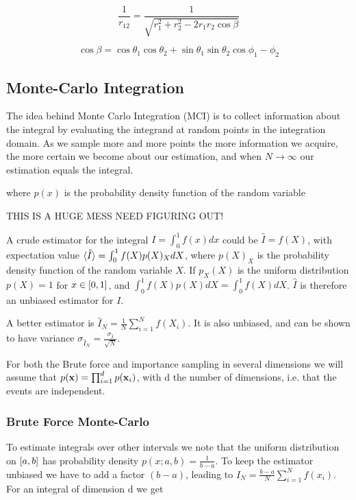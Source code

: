 \begin{equation}
  \label{eq:distance_spherical}
  \frac{1}{r_{12}} = \frac{1}{\sqrt{r_1^2 + r_2^2 - 2r_1r_2 \cos{\beta}}}
\end{equation}

\begin{equation}
  \label{eq:cos_beta}
  \cos{\beta} = \cos{\theta_1} \cos{\theta_2} + \sin{\theta_1} \sin{\theta_2}
  \cos{\phi_1 -\phi_2}
\end{equation}

\subsection{Monte-Carlo Integration}

The idea behind Monte Carlo Integration (MCI) is to collect information
about the integral by evaluating the integrand
at random points in the integration domain. As we sample more and more points
the more information we acquire, the more certain we become about our
estimation, and when $N \to \infty$ our estimation equals the integral.  

where $p(x)$ is the probability density function of the random variable

THIS IS A HUGE MESS NEED FIGURING OUT!

A crude estimator for the integral $ I = \int_{0}^{1} f(x)dx $ could be $
\hat{I} = f(X)$, with expectation value $\braket{\hat{I}} = \int_{0}^{1}
f(X)p(X)_XdX$, where $p(X)_X$ is the probability density function of the random
variable $X$. If $p_X(X)$ is the uniform distribution $p(X) = 1$ for $x \in
\left[0,1\right]$, and $\int_{0}^{1} f(X)p(X) dX = \int_{0}^{1}f(X) dX$. $\hat{I}$ is
therefore an unbiased estimator for $I$.

A better estimator is $\hat{I}_N = \frac{1}{N}\sum_{i=1}^{N} f(X_i)$. It is also
unbiased, and can be shown to have variance
$\sigma_{\hat{I}_N} = \frac{\sigma_{\hat{I}}}{\sqrt{N}}$.

For both the Brute force and importance sampling in several dimensions we will
assume that $p(\mathbf{x}) = \prod_{i=1}^{d} p(\mathbf{x}_i)$, with d the number of dimensions,
i.e. that the events are independent.

\subsubsection{Brute Force Monte-Carlo}

To estimate integrals over other intervals we note that the uniform
distribution on $\left[a,b\right]$ has probability density $p(x;a,b) = \frac{1}{b-a}$.
To keep the estimator unbiased we have to add a factor $(b-a)$, leading to
$\hat{I}_N = \frac{b-a}{N}\sum_{i=1}^{N}f(x_i)$.
For an integral of dimension d we get

